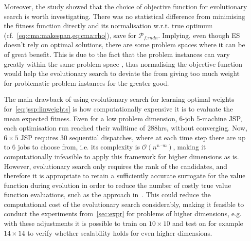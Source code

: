 \documentclass{acm_proc_article-sp}
\begin{document}
Moreover, the study showed that the choice of objective function  for evolutionary search is worth investigating. There was no statistical difference from minimising the fitness function directly and its normalisation w.r.t. true optimum (cf.~\cref{eq:cma:makespan,eq:cma:rho}), save for $\mathcal{P}_{f.rndn}$. Implying, even though ES doesn't rely on optimal solutions, there are some problem spaces where it can be of great benefit. This is due to the fact that the problem instances can vary greatly within the same problem space \cite{InRu12}, thus normalising the objective function would help the evolutionary search to deviate the from giving too much weight for problematic problem instances for the greater good.



The main drawback of using evolutionary search for learning optimal weights for~\cref{eq:jssp:linweights} is how computationally expensive it is to evaluate the mean expected fitness. Even for a low problem dimension, 6-job 5-machine JSP, each optimisation run reached their walltime of 288hrs, without converging. Now, $6\times5$ JSP requires 30 sequential dispatches, where at each time step there are up to $6$ jobs to choose from, i.e. its complexity is $\mathcal{O}(n^{n\cdot m})$, making it computationally infeasible to apply this framework for higher dimensions as is. 
However, evolutionary search only requires the rank of the candidates, and therefore it is appropriate to retain a sufficiently accurate surrogate for the value function during evolution in order to reduce the number of costly true value function evaluations, such as the approach in~\cite{InRu11b}. This could reduce the computational cost of the evolutionary search considerably, making it feasible to conduct the experiments from~\cref{sec:expr} for problems of higher dimensions, e.g. with these adjustments it is possible to train on $10\times10$ and test on for example $14\times14$ to verify whether scalability holds for even higher dimensions.  
\end{document}
